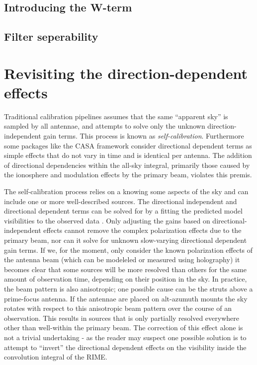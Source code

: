 \subsection{Introducing the W-term}
\subsection{Filter seperability}
\section{Revisiting the direction-dependent effects}
Traditional calibration pipelines assumes that the same ``apparent sky'' is sampled by all antennae, and attempts to solve only the unknown direction-independent gain terms.
This process is known as \textit{self-calibration}. Furthermore some packages like the CASA framework consider directional dependent terms as simple effects 
that do not vary in time and is identical per antenna. The addition of directional dependencies within the all-sky integral, primarily those caused by the 
ionosphere and modulation effects by the primary beam, violates this premis. 

The self-calibration process relies on a knowing some aspects of the sky and can include one or more well-described sources. The directional
independent and directional dependent terms can be solved for by a fitting the predicted model visibilities to the observed 
data \cite{noordam2010meqtrees}. Only adjusting the gains based on directional-independent effects cannot remove the complex 
polarization effects due to the primary beam, nor can it solve for unknown slow-varying directional dependent gain terms. If we, for 
the moment, only consider the known polarization effects of the antenna beam (which can be modeleled or measured using holography) it 
becomes clear that some sources will be more resolved than others for the same amount of observation time, 
depending on their position in the sky. In practice, the beam pattern is also anisotropic; one possible cause can be 
the struts above a prime-focus antenna. If the antennae are placed on alt-azumuth mounts the sky rotates with respect 
to this anisotropic beam pattern over the course of an observation. This results in sources that is only partially 
resolved everywhere other than well-within the primary beam. The correction of this effect alone is not a trivial undertaking - 
as the reader may suspect one possible solution is to attempt to ``invert'' the directional dependent effects on the visibility 
inside the convolution integral of the RIME.

